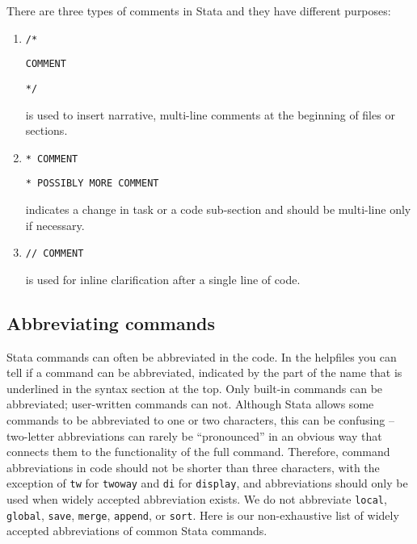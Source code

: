 There are three types of comments in Stata and they have different purposes:
\begin{enumerate}
  \item \texttt{/*}

  \texttt{COMMENT}

  \texttt{*/}

  is used to insert narrative, multi-line comments at the beginning of files or sections.
  \item \texttt{* COMMENT}

  \texttt{* POSSIBLY MORE COMMENT}

  indicates a change in task or a code sub-section and should be multi-line only if necessary.
  \item \texttt{// COMMENT}

  is used for inline clarification after a single line of code.
\end{enumerate}


\subsection{Abbreviating commands}

Stata commands can often be abbreviated in the code. In the helpfiles you can tell if a command can be
abbreviated, indicated by the part of the name that is underlined in the syntax section at the top.
Only built-in commands can be abbreviated; user-written commands can not.
Although Stata allows some commands to be abbreviated to one or two characters,
this can be confusing -- two-letter abbreviations can rarely be ``pronounced''
in an obvious way that connects them to the functionality of the full command.
Therefore, command abbreviations in code should not be shorter than three characters,
with the exception of \texttt{tw} for \texttt{twoway} and \texttt{di} for \texttt{display},
and abbreviations should only be used when widely accepted abbreviation exists.
We do not abbreviate \texttt{local}, \texttt{global}, \texttt{save}, \texttt{merge}, \texttt{append}, or \texttt{sort}.
Here is our non-exhaustive list of widely accepted abbreviations of common Stata commands.

